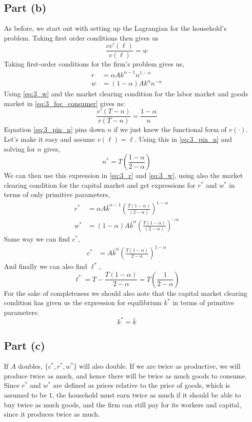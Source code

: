 \documentclass{scrartcl}
\newcommand{\lep}{\left(}
\newcommand{\rip}{\right)}
\begin{document}
\subsection*{Part (b)}
As before, we start out with setting up the Lagrangian for the household's problem. Taking first order conditions then gives us
\begin{equation}
	\frac{cv'(\ell)}{v(\ell)} = w \label{eq:3_foc_consumer}
\end{equation}
Taking first-order conditions for the firm's problem gives us, 
\begin{align}
	r &= \alpha A k^{\alpha -1}n^{1-\alpha} \label{eq:3_r}\\
	w &= (1-\alpha) A k^{\alpha}n^{-\alpha} \label{eq:3_w}
\end{align}
Using \eqref{eq:3_w} and the market clearing condition for the labor market and goods market in \eqref{eq:3_foc_consumer} gives us: 
\begin{equation}
	\frac{v'(T-n)}{v(T-n)} = \frac{1-\alpha}{n} \label{eq:3_pin_n}
\end{equation}
Equation \eqref{eq:3_pin_n} pins down $n$ if we just knew the functional form of $v(\cdot)$. Let's make it easy and assume $v(\ell)=\ell$. Using this in \eqref{eq:3_pin_n} and solving for $n$ gives, 
\[
	n^* = T \lep \frac{1-\alpha}{2-\alpha} \rip
\]
We can then use this expression in \eqref{eq:3_r} and \eqref{eq:3_w}, using also the market clearing condition for the capital market and get expressions for $r^*$ and $w^*$ in terms of only primitive parameters, 
\begin{align*}
	r^* &= \alpha A \bar{k}^{\alpha-1}\lep \frac{T(1-\alpha)}{(2-\alpha)} \rip^{1-\alpha} \\
	w^* &= (1-\alpha) A \bar{k}^{\alpha}\lep \frac{T(1-\alpha)}{(2-\alpha)} \rip^{-\alpha} 
\end{align*}
Same way we can find $c^*$, 
\begin{align*}
	c^* &= A \bar{k}^\alpha \lep \frac{T(1-\alpha)}{2-\alpha} \rip^{1-\alpha} 
\end{align*}
And finally we can also find $\ell^*$, 
\[
	\ell^* = T - \frac{T(1-\alpha)}{2-\alpha} = T \lep \frac{1}{2-\alpha}\rip
\]
For the sake of completeness we should also note that the capital market clearing condition has given us the expression for equilibrium $k^*$ in terms of primitive parameters: 
\[
	k^* = \bar{k}
\]

\subsection*{Part (c)}
If $A$ doubles, $\{c^*, r^*, w^*\}$ will also double. If we are twice as productive, we will produce twice as much, and hence there will be twice as much goods to consume. Since $r^*$ and $w^*$ are defined as prices relative to the price of goods, which is assumed to be $1$, the household must earn twice as much if it should be able to buy twice as much goods, and the firm can still pay for its workers and capital, since it produces twice as much. 
\end{document}
